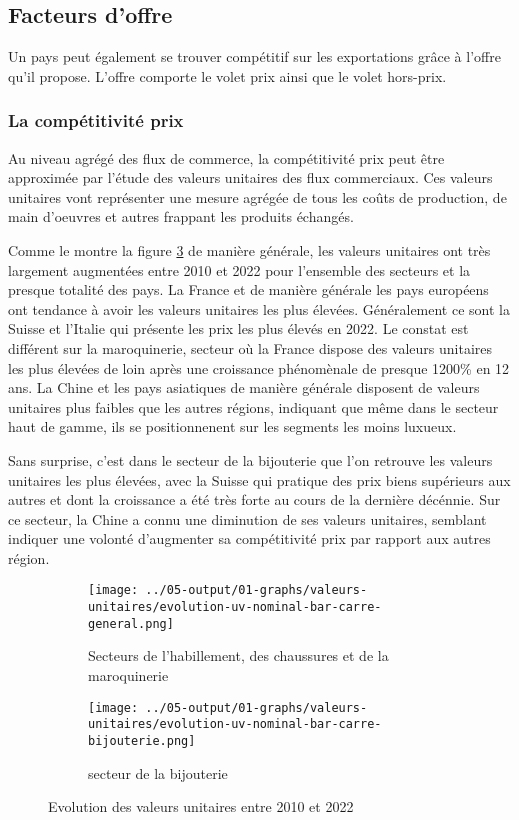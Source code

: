 \documentclass[french,10pt,a4paper]{article}
\begin{document}
\subsection{Facteurs d'offre}
Un pays peut également se trouver compétitif sur les exportations grâce à l'offre qu'il propose. L'offre comporte le volet prix ainsi que le volet hors-prix.


\subsubsection{La compétitivité prix}
Au niveau agrégé des flux de commerce, la compétitivité prix peut être approximée par l'étude des valeurs unitaires des flux commerciaux. Ces valeurs unitaires vont représenter une mesure agrégée de tous les coûts de production, de main d'oeuvres et autres frappant les produits échangés.

Comme le montre la figure \ref{fig:valeurs-unitaires} de manière générale, les valeurs unitaires ont très largement augmentées entre 2010 et 2022 pour l'ensemble des secteurs et la presque totalité des pays. La France et de manière générale les pays européens ont tendance à avoir les valeurs unitaires les plus élevées. Généralement ce sont la Suisse et l'Italie qui présente les prix les plus élevés en 2022. Le constat est différent sur la maroquinerie, secteur où la France dispose des valeurs unitaires les plus élevées de loin après une croissance phénomènale de presque 1200\% en 12 ans. La Chine et les pays asiatiques de manière générale disposent de valeurs unitaires plus faibles que les autres régions, indiquant que même dans le secteur haut de gamme, ils se positionnenent sur les segments les moins luxueux.

Sans surprise, c'est dans le secteur de la bijouterie que l'on retrouve les valeurs unitaires les plus élevées, avec la Suisse qui pratique des prix biens supérieurs aux autres et dont la croissance a été très forte au cours de la dernière décénnie. Sur ce secteur, la Chine a connu une diminution de ses valeurs unitaires, semblant indiquer une volonté d'augmenter sa compétitivité prix par rapport aux autres région. 


\begin{figure}[!h]
  \centering
  \begin{subfigure}{\textwidth}
    \centering    \texttt{[image: ../05-output/01-graphs/valeurs-unitaires/evolution-uv-nominal-bar-carre-general.png]}
    \caption{Secteurs de l'habillement, des chaussures et de la maroquinerie}
    \label{fig:evolution-uv-nominal-bar-carre-general}
  \end{subfigure}
  \vspace{0.5cm}
  \begin{subfigure}{\textwidth}
    \centering \texttt{[image: ../05-output/01-graphs/valeurs-unitaires/evolution-uv-nominal-bar-carre-bijouterie.png]}
 \caption{secteur de la bijouterie}
 \label{fig:evolution-uv-nominal-bar-carre-bijouterie.png}
  \end{subfigure}
  \caption{Evolution des valeurs unitaires entre 2010 et 2022}
  \label{fig:valeurs-unitaires}
\end{figure}
\end{document}
